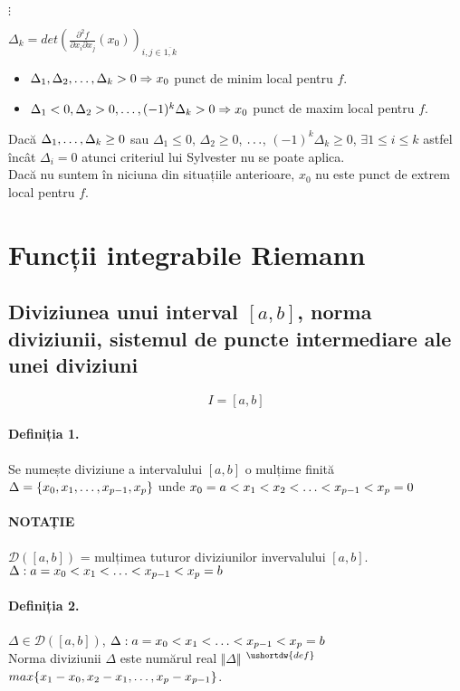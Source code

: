 $\vdots$

$\Delta_{k} = det \left( \displaystyle\frac{\partial^{2} f}{\partial x_{i} \partial x_{j}}(x_{0})\right)_{i,j \in \overline{1,k}}$
\begin{itemize}
    \item $\Delta_{1}, \Delta_{2}, \mathellipsis, \Delta_{k} > 0 \Rightarrow x_{0}$ punct de minim local pentru $f$.
    \item $\Delta_{1} < 0, \Delta_{2} > 0, \mathellipsis, (-1)^{k} \Delta_{k} > 0 \Rightarrow x_{0}$ punct de maxim local pentru $f$.
\end{itemize}
Dacă $\Delta_{1}, \mathellipsis, \Delta_{k} \geq 0$ sau $\Delta_{1} \leq 0$, $\Delta_{2} \geq 0$, $\mathellipsis$, $(-1)^{k} \Delta_{k} \geq 0$,
$\exists 1 \leq i \leq k$ astfel încât $\Delta_{i} = 0$ atunci criteriul lui Sylvester nu se poate aplica. \\
Dacă nu suntem în niciuna din situațiile anterioare, $x_{0}$ nu este punct de extrem local pentru $f$.

\section{Funcții integrabile Riemann}
\subsection{Diviziunea unui interval $[a,b]$, norma diviziunii, sistemul de puncte intermediare ale unei diviziuni}
\begin{equation}
    I = [a,b]
\end{equation}

\paragraph{Definiția 1.}
Se numește diviziune a intervalului $[a,b]$ o mulțime finită $\Delta = \{x_{0}, x_{1}, \mathellipsis, x_{p-1}, x_{p} \}$ unde 
$x_{0} = a < x_{1} < x_{2} < \mathellipsis < x_{p-1} < x_{p} = 0$

\paragraph{NOTAȚIE}
$\mathcal{D}([a,b])$ = mulțimea tuturor diviziunilor invervalului $[a,b]$. \\
$\Delta: a = x_{0} < x_{1} < \mathellipsis < x_{p-1} < x_{p} = b$

\paragraph{Definiția 2.}
$\Delta \in \mathcal{D}([a,b])$, $\Delta: a = x_{0} < x_{1} < \mathellipsis < x_{p-1} < x_{p} = b$ \\
Norma diviziunii $\Delta$ este numărul real $\Vert \Delta \Vert$ $^{\ushortdw{def}}$ $max \{x_{1} - x_{0}, x_{2} - x_{1}, \mathellipsis, x_{p} - x_{p-1} \}$.

